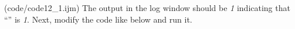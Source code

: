 (code/code12_1.ijm)
The output in the log window should be \textit{1} indicating that ``'' is \textit{1}. Next, modify the code like below and run it.